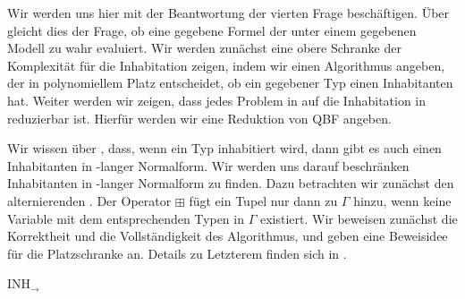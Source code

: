 Wir werden uns hier mit der Beantwortung der vierten Frage beschäftigen. Über  gleicht dies der Frage, ob eine gegebene Formel der \IPCarr{} unter einem gegebenen Modell zu wahr evaluiert. Wir werden zunächst eine obere Schranke der Komplexität für die Inhabitation zeigen, indem wir einen Algorithmus angeben, der in polynomiellem Platz entscheidet, ob ein gegebener Typ einen Inhabitanten hat. Weiter werden wir zeigen, dass jedes Problem in \PSPACE{} auf die Inhabitation in \STLC{} reduzierbar ist. Hierfür werden wir eine Reduktion von \textsc{QBF} angeben.

Wir wissen über , dass, wenn ein Typ inhabitiert wird, dann gibt es auch einen Inhabitanten in \teta-langer Normalform. Wir werden uns darauf beschränken Inhabitanten in \teta-langer Normalform zu finden. Dazu betrachten wir zunächst den alternierenden . Der Operator $\boxplus$ fügt ein Tupel nur dann zu $\Gamma$ hinzu, wenn keine Variable mit dem entsprechenden Typen in $\Gamma$ existiert. Wir beweisen zunächst die Korrektheit und die Vollständigkeit des Algorithmus, und geben eine Beweisidee für die Platzschranke an. Details zu Letzterem finden sich in \cite{pawel}.

\begin{algorithm}[t]
    \DontPrintSemicolon
    \caption{INH$_{\to}$}    
    \label{alg:inhstlc}
\end{algorithm}

